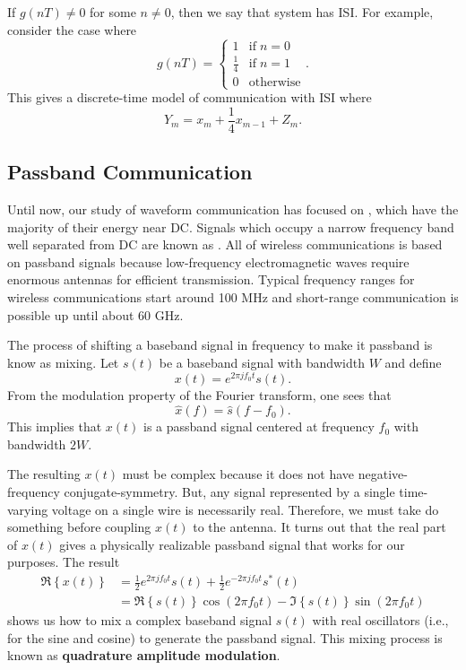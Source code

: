 \begin{example}
If $g(nT) \neq 0$ for some $n\neq 0$, then we say that system has ISI.
For example, consider the case where
\[ g(nT) = \begin{cases} 1 & \mathrm{if}\; n=0 \\ \frac{1}{4} & \mathrm{if}\; n=1 \\ 0 & \mathrm{otherwise} \end{cases}. \]
This gives a discrete-time model of communication with ISI where
\[ Y_m = x_m + \frac{1}{4} x_{m-1} + Z_m. \]
\end{example}


\subsection{Passband Communication}

Until now, our study of waveform communication has focused on , which have the majority of their energy near DC.
Signals which occupy a narrow frequency band well separated from DC are known as .
All of wireless communications is based on passband signals because low-frequency electromagnetic waves require enormous antennas for efficient transmission.
Typical frequency ranges for wireless communications start around 100 MHz and short-range communication is possible up until about 60 GHz.

The process of shifting a baseband signal in frequency to make it passband is know as mixing.
Let $s(t)$ be a baseband signal with bandwidth $W$ and define
\[ x(t) = e^{2\pi j f_0 t} s(t). \]
From the modulation property of the Fourier transform, one sees that
\[ \hat{x}(f) = \hat{s}(f-f_0). \]
This implies that $x(t)$ is a passband signal centered at frequency $f_0$ with bandwidth $2W$.

The resulting $x(t)$ must be complex because it does not have negative-frequency conjugate-symmetry.
But, any signal represented by a single time-varying voltage on a single wire is necessarily real.
Therefore, we must take do something before coupling $x(t)$ to the antenna.
It turns out that the real part of $x(t)$ gives a physically realizable passband signal that works for our purposes.
The result
\begin{align*}
\Re \left\{ x(t) \right \}
& = \frac{1}{2} e^{2\pi j f_0 t} s(t) + \frac{1}{2}  e^{-2\pi j f_0 t} s^* (t) \\
& = \Re \left\{ s(t) \right\} \cos(2 \pi f_0 t) - \Im \left\{ s(t) \right\} \sin (2\pi f_0 t)
\end{align*}
shows us how to mix a complex baseband signal $s(t)$ with real oscillators (i.e., for the sine and cosine) to generate the passband signal.
This mixing process is known as \textbf{quadrature amplitude modulation}.

